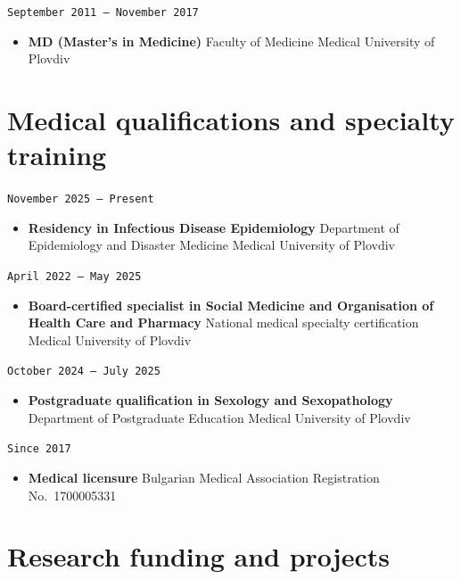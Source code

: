 \documentclass[
  10.5pt,
  a4paper,
  DIV=11,
  numbers=noendperiod]{scrartcl}
\providecommand{\tightlist}{%
  \setlength{\itemsep}{0pt}\setlength{\parskip}{0pt}}
\let\oldtexttt\texttt
\renewcommand{\texttt}[1]{{\color{cvbronze}\small\oldtexttt{#1}}}
\begin{document}
\texttt{September\ 2011\ –\ November\ 2017}

\begin{itemize}
\tightlist
\item
  \textbf{MD (Master's in Medicine)} \textbar{} Faculty of Medicine
  \textbar{} Medical University of Plovdiv
\end{itemize}

\section{Medical qualifications and specialty
training}\label{medical-qualifications-and-specialty-training}

\texttt{November\ 2025\ –\ Present}

\begin{itemize}
\tightlist
\item
  \textbf{Residency in Infectious Disease Epidemiology} \textbar{}
  Department of Epidemiology and Disaster Medicine \textbar{} Medical
  University of Plovdiv
\end{itemize}

\texttt{April\ 2022\ –\ May\ 2025}

\begin{itemize}
\tightlist
\item
  \textbf{Board-certified specialist in Social Medicine and Organisation
  of Health Care and Pharmacy} \textbar{} National medical specialty
  certification \textbar{} Medical University of Plovdiv
\end{itemize}

\texttt{October\ 2024\ –\ July\ 2025}

\begin{itemize}
\tightlist
\item
  \textbf{Postgraduate qualification in Sexology and Sexopathology}
  \textbar{} Department of Postgraduate Education \textbar{} Medical
  University of Plovdiv
\end{itemize}

\texttt{Since\ 2017}

\begin{itemize}
\tightlist
\item
  \textbf{Medical licensure} \textbar{} Bulgarian Medical Association
  \textbar{} Registration No.~1700005331
\end{itemize}

\section{Research funding and
projects}\label{research-funding-and-projects}
\end{document}
